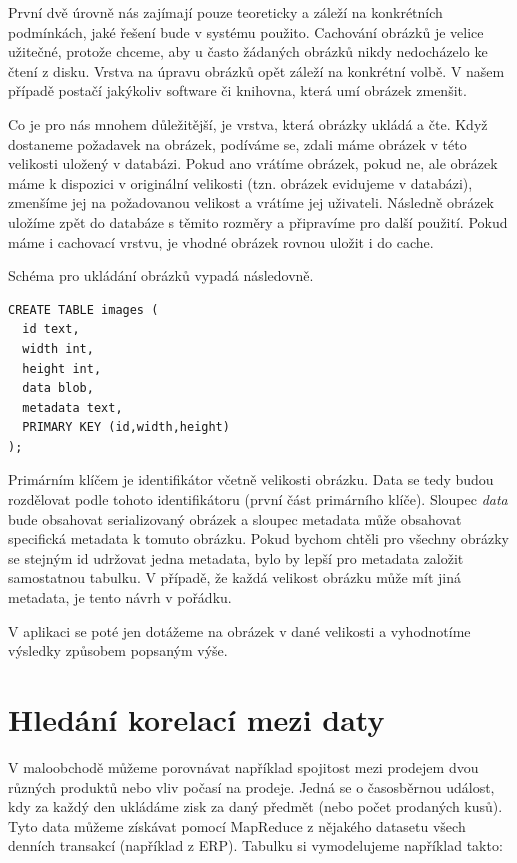 První dvě úrovně nás zajímají pouze teoreticky a záleží na konkrétních podmínkách, jaké řešení bude v systému použito. Cachování obrázků je velice užitečné, protože chceme, aby u často žádaných obrázků nikdy nedocházelo ke čtení z disku. Vrstva na úpravu obrázků opět záleží na konkrétní volbě. V našem případě postačí jakýkoliv software či knihovna, která umí obrázek zmenšit. 

Co je pro nás mnohem důležitější, je vrstva, která obrázky ukládá a čte. Když dostaneme požadavek na obrázek, podíváme se, zdali máme obrázek v této velikosti uložený v databázi. Pokud ano vrátíme obrázek, pokud ne, ale obrázek máme k dispozici v originální velikosti (tzn. obrázek evidujeme v databázi), zmenšíme jej na požadovanou velikost a vrátíme jej uživateli. Následně obrázek uložíme zpět do databáze s těmito rozměry a připravíme pro další použití. Pokud máme i cachovací vrstvu, je vhodné obrázek rovnou uložit i do cache. 

Schéma pro ukládání obrázků vypadá následovně. 

\begin{lstlisting}[caption={Tabulka pro ukládání obrázků v různých velikostech},label=img1]
CREATE TABLE images ( 
  id text,
  width int,
  height int,
  data blob,
  metadata text, 
  PRIMARY KEY (id,width,height) 
);
\end{lstlisting}

Primárním klíčem je identifikátor včetně velikosti obrázku. Data se tedy budou rozdělovat podle tohoto identifikátoru (první část primárního klíče). Sloupec \emph{data} bude obsahovat serializovaný obrázek a sloupec metadata může obsahovat specifická metadata k tomuto obrázku. Pokud bychom chtěli pro všechny obrázky se stejným id udržovat jedna metadata, bylo by lepší pro metadata založit samostatnou tabulku. V případě, že každá velikost obrázku může mít jiná metadata, je tento návrh v pořádku. 

V aplikaci se poté jen dotážeme na obrázek v dané velikosti a vyhodnotíme výsledky způsobem popsaným výše. 

\section{Hledání korelací mezi daty}
V maloobchodě můžeme porovnávat například spojitost mezi prodejem dvou různých produktů nebo vliv počasí na prodeje. Jedná se o časosběrnou událost, kdy za každý den ukládáme zisk za daný předmět (nebo počet prodaných kusů). Tyto data můžeme získávat pomocí MapReduce z nějakého datasetu všech denních transakcí (například z ERP). Tabulku si vymodelujeme například takto: 

